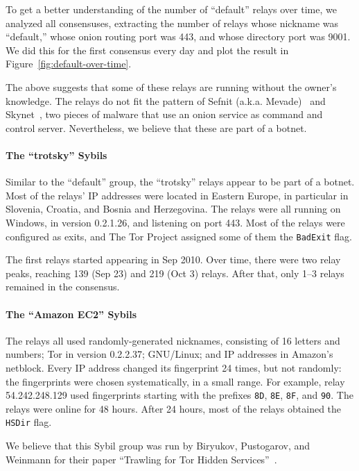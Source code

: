 To get a better understanding of the number of ``default'' relays over time, we
analyzed all consensuses, extracting the number of relays whose nickname was
``default,'' whose onion routing port was 443, and whose directory port was
9001.  We did this for the first consensus every day and plot the result in
Figure~\ref{fig:default-over-time}.

The above suggests that some of these relays are running without the owner's
knowledge.  The relays do not fit the pattern of Sefnit (a.k.a.
Mevade)~\cite{sefnit} and Skynet~\cite{skynet}, two pieces of malware that use
an onion service as command and control server.  Nevertheless, we believe that
these are part of a botnet.

\paragraph{The ``trotsky'' Sybils}
Similar to the ``default'' group, the ``trotsky'' relays appear to be part of
a botnet.  Most of the relays' IP addresses were located in Eastern Europe, in
particular in Slovenia, Croatia, and Bosnia and Herzegovina.  The relays were
all running on Windows, in version 0.2.1.26, and listening on port 443.  Most of
the relays were configured as exits, and The Tor Project assigned some of them
the \texttt{BadExit} flag.

The first relays started appearing in Sep 2010.  Over time, there were two relay
peaks, reaching 139 (Sep 23) and 219 (Oct 3) relays.  After that, only 1--3
relays remained in the consensus.

\paragraph{The ``Amazon EC2'' Sybils}
The relays all used randomly-generated nicknames, consisting of 16 letters and
numbers; Tor in version 0.2.2.37; GNU/Linux; and IP addresses in Amazon's
netblock.  Every IP address changed its fingerprint 24 times, but not randomly:
the fingerprints were chosen systematically, in a small range.  For example,
relay 54.242.248.129 used fingerprints starting with the prefixes \texttt{8D},
\texttt{8E}, \texttt{8F}, and \texttt{90}.  The relays were online for 48 hours.
After 24 hours, most of the relays obtained the \texttt{HSDir} flag.

We believe that this Sybil group was run by Biryukov, Pustogarov, and Weinmann
for their paper ``Trawling for Tor Hidden Services''~\cite{Biryukov2013a}.

